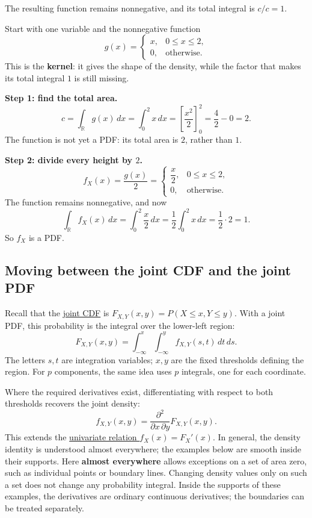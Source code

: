 \documentclass[a4paper,12pt,oneside]{report}
\begin{document}
The resulting function remains nonnegative, and its total integral
is $c/c=1$.

\begin{framedexample}{}
\label{ex:normalize-linear-kernel}
Start with one variable and the nonnegative function
\[
  g(x)=
  \begin{cases}
    x,&0\leq x\leq2,\\
    0,&\text{otherwise}.
  \end{cases}
\]
This is the \textbf{kernel}: it gives the shape of the density,
while the factor that makes its total integral $1$ is still missing.

\textbf{Step 1: find the total area.}
\[
  c=\int_{\mathbb R}g(x)\,dx
    =\int_0^2x\,dx
    =\left[\frac{x^2}{2}\right]_0^2
    =\frac42-0=2.
\]
The function is not yet a PDF: its total area is $2$, rather than $1$.

\textbf{Step 2: divide every height by $2$.}
\[
  f_X(x)=\frac{g(x)}{2}=
  \begin{cases}
    \dfrac{x}{2},&0\leq x\leq2,\\
    0,&\text{otherwise}.
  \end{cases}
\]
The function remains nonnegative, and now
\[
  \int_{\mathbb R}f_X(x)\,dx
    =\int_0^2\frac{x}{2}\,dx
    =\frac12\int_0^2x\,dx
    =\frac12\cdot2=1.
\]
So $f_X$ is a PDF.
\end{framedexample}

\subsection{Moving between the joint CDF and the joint PDF}

Recall that the \hyperref[sec:joint-cdf]{joint CDF} is
$F_{X,Y}(x,y)=P(X\leq x,Y\leq y)$. With a joint PDF, this probability
is the integral over the lower-left region:
\[
  F_{X,Y}(x,y)
  =\int_{-\infty}^{x}\int_{-\infty}^{y}
       f_{X,Y}(s,t)\,dt\,ds.
\]
The letters $s,t$ are integration variables; $x,y$ are the fixed
thresholds defining the region. For $p$ components, the same idea
uses $p$ integrals, one for each coordinate.

Where the required derivatives exist, differentiating with respect
to both thresholds recovers the joint density:
\[
  f_{X,Y}(x,y)
    =\frac{\partial^2}{\partial x\,\partial y}F_{X,Y}(x,y).
\]
This extends the \hyperref[rel:cdf-to-pdf]{univariate relation $f_X(x)=F_X'(x)$}.
In general, the density identity is understood almost everywhere;
the examples below are smooth inside their supports.
Here \textbf{almost everywhere} allows exceptions on a set of area
zero, such as individual points or boundary lines. Changing density
values only on such a set does not change any probability integral.
Inside the supports of these examples, the derivatives are ordinary
continuous derivatives; the boundaries can be treated separately.
\end{document}
